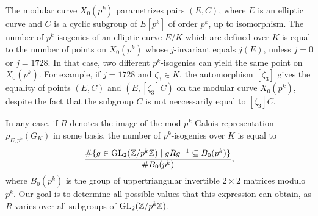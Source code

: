 \documentclass[10pt,leqno]{amsart}
\newcommand{\Z}{\mathbb{Z}}
\newcommand{\GL}{\textnormal{GL}}
\theoremstyle{definition}
\theoremstyle{remark}
\numberwithin{theorem}{section}
\begin{document}
The modular curve $X_0(p^k)$ parametrizes pairs $(E, C)$, where $E$ is an elliptic curve and $C$ is a cyclic subgroup of $E[p^k]$ of order $p^k$, up to isomorphism. The number of $p^k$-isogenies of an elliptic curve $E/K$ which are defined over $K$ is equal to the number of points on $X_0(p^k)$ whose $j$-invariant equals $j(E)$, unless $j=0$ or $j=1728$. In that case, two different $p^k$-isogenies can yield the same point on $X_0(p^k)$. For example, if $j=1728$ and $\zeta_3 \in K$, the automorphism $[\zeta_3]$ gives the equality of points $(E, C)$ and $(E, [\zeta_3]C)$ on the modular curve $X_0(p^k)$, despite the fact that the subgroup $C$ is not neccessarily equal to $[\zeta_3]C$.

In any case, if $R$ denotes the image of the mod $p^k$ Galois representation $\rho_{E,p^k}(G_K)$ in some basis, the number of $p^k$-isogenies over $K$ is equal to $$\frac{\#\{g \in \GL_2(\Z/p^k\Z) \mid gRg^{-1} \subseteq B_0(p^k)\} }{\#B_0(p^k)},$$
where $B_0(p^k)$ is the group of uppertriangular invertible $2\times 2$ matrices modulo $p^k$. 
Our goal is to determine all possible values that this expression can obtain, as $R$ varies over all subgroups  of $\GL_2(\Z/p^k\Z)$.
\end{document}
